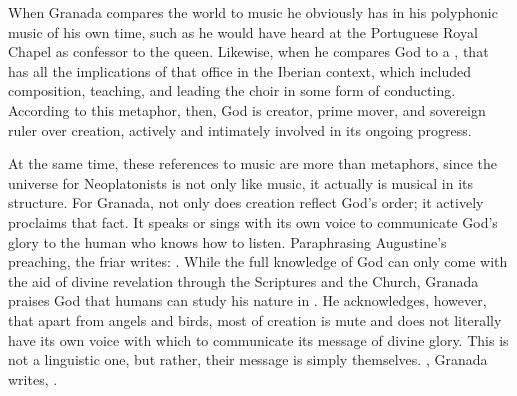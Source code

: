 
When Granada compares the world to music  he
obviously has in his  polyphonic music of his own time, such
as he would have heard at the Portuguese Royal Chapel as confessor to the
queen.
Likewise, when he compares God to a , that has all
the implications of that office in the Iberian context, which included
composition, teaching, and leading the choir in some form of conducting.
According to this metaphor, then, God is creator, prime mover, and sovereign
ruler over creation, actively and intimately involved in its ongoing progress.


At the same time, these references to music are more than metaphors, since the
universe for Neoplatonists is not only like music, it actually is musical in
its structure.
For Granada, not only does creation reflect God's order; it actively proclaims
that fact.
It speaks or sings with its own voice to communicate God's glory to the human
who knows how to listen.
Paraphrasing Augustine's preaching, the friar writes: .%
    \Autocite[185, glossing Augustine's commentary on ]
    {LuisdeGranada:Simbolo} 
While the full knowledge of God can only come with the aid of divine revelation
through the Scriptures and the Church, Granada praises God that humans can
study his nature in .%
    \Autocite[186]{LuisdeGranada:Simbolo}
He acknowledges, however, that apart from angels and birds, most of
creation is mute and does not literally have its own voice with which to
communicate its message of divine glory.
This  is not a linguistic one, but rather, their message is
simply themselves.
, Granada writes, .%
    \Autocite[192]{LuisdeGranada:Simbolo}

